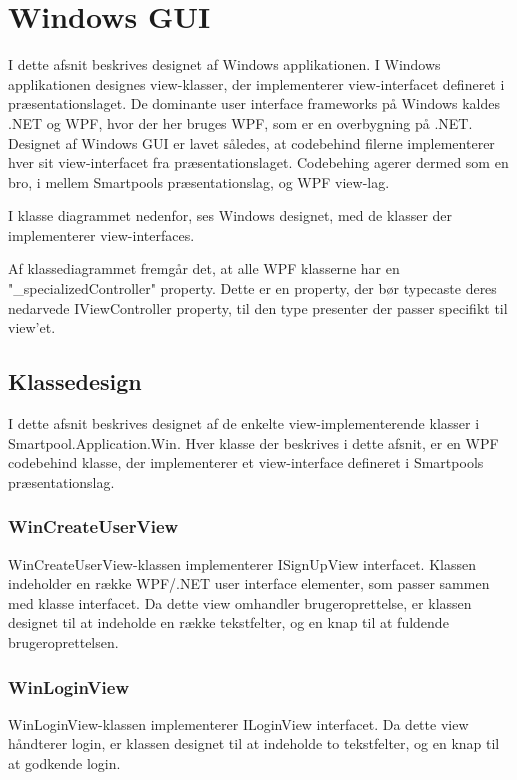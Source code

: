 \section{Windows GUI}
I dette afsnit beskrives designet af Windows applikationen. I Windows applikationen designes view-klasser, der implementerer view-interfacet defineret i præsentationslaget. De dominante user interface frameworks på Windows kaldes .NET og WPF, hvor der her bruges WPF, som er en overbygning på .NET. 
Designet af Windows GUI er lavet således, at codebehind filerne implementerer hver sit view-interfacet fra præsentationslaget.
Codebehing agerer dermed som en bro, i mellem Smartpools præsentationslag, og WPF view-lag.

I klasse diagrammet nedenfor, ses Windows designet, med de klasser der implementerer view-interfaces.


Af klassediagrammet fremgår det, at alle WPF klasserne har en "\_specializedController" property. Dette er en property, der bør typecaste deres nedarvede IViewController property, til den type presenter der passer specifikt til view'et.

\subsection{Klassedesign}
I dette afsnit beskrives designet af de enkelte view-implementerende klasser i Smartpool.Application.Win. Hver klasse der beskrives i dette afsnit, er en WPF codebehind klasse, der implementerer et view-interface defineret i Smartpools præsentationslag.

\subsubsection{WinCreateUserView}
WinCreateUserView-klassen implementerer ISignUpView interfacet. Klassen indeholder en række WPF/.NET user interface elementer, som passer sammen med klasse interfacet. Da dette view omhandler brugeroprettelse, er klassen designet til at indeholde en række tekstfelter, og en knap til at fuldende brugeroprettelsen. 

\subsubsection{WinLoginView}
WinLoginView-klassen implementerer ILoginView interfacet. Da dette view håndterer login, er klassen designet til at indeholde to tekstfelter, og en knap til at godkende login.

